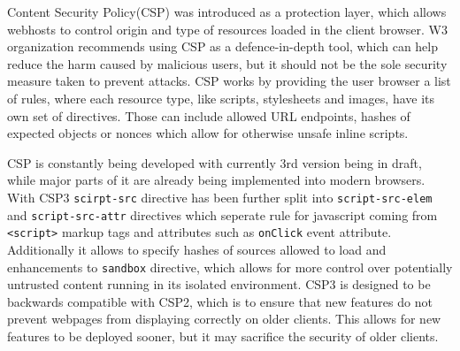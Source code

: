 \documentclass[11]{article}   %
\begin{document}
%
%

Content Security Policy(CSP) was introduced as a protection layer, which allows webhosts to control origin and type of resources loaded in the client browser. 
W3 organization recommends using CSP as a defence-in-depth tool, which can help reduce the harm caused by malicious users, but it should not be the sole security measure taken to prevent attacks.
CSP works by providing the user browser a list of rules, where each resource type, like scripts, stylesheets and images, have its own set of directives.
Those can include allowed URL endpoints, hashes of expected objects or nonces which allow for otherwise unsafe inline scripts.


CSP is constantly being developed with currently 3rd version being in draft, while major parts of it are already being implemented into modern browsers.
With CSP3 \texttt{scirpt-src} directive has been further split into \texttt{script-src-elem} and \texttt{script-src-attr} directives which seperate rule for javascript coming from \texttt{<script>} markup tags and attributes such as \texttt{onClick} event attribute.
Additionally it allows to specify hashes of sources allowed to load and enhancements to \texttt{sandbox} directive, which allows for more control over potentially untrusted content running in its isolated environment.
CSP3 is designed to be backwards compatible with CSP2, which is to ensure that new features do not prevent webpages from displaying correctly on older clients.
This allows for new features to be deployed sooner, but it may sacrifice the security of older clients.
\end{document}
